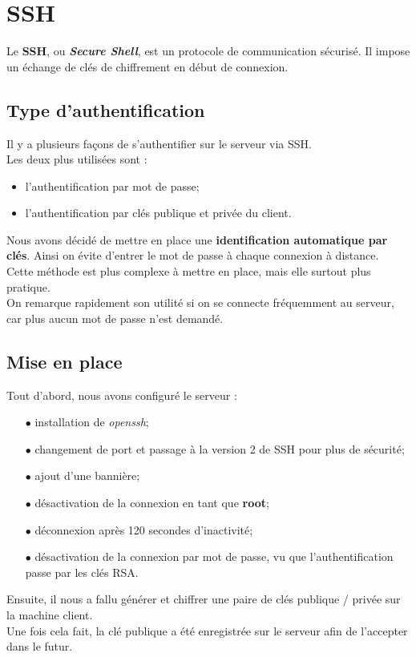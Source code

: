 \section{SSH}
\label{sec:ssh}

Le \textbf{SSH}, ou \textit{\textbf{Secure Shell}}, est un protocole de
communication sécurisé. Il impose un échange de clés de chiffrement en début de
connexion.


\subsection{Type d'authentification}
\label{subsec:type-authentification}

Il y a plusieurs façons de s'authentifier sur le serveur via SSH. \\
Les deux plus utilisées sont :
\begin{itemize}
    \item l'authentification par mot de passe;
    \item l'authentification par clés publique et privée du client. \\
\end{itemize}

Nous avons décidé de mettre en place une \textbf{identification automatique par
clés}. Ainsi on évite d'entrer le mot de passe à chaque connexion à distance. \\
Cette méthode est plus complexe à mettre en place, mais elle surtout plus
pratique. \\

On remarque rapidement son utilité si on se connecte fréquemment au serveur, car
plus aucun mot de passe n'est demandé.


\subsection{Mise en place}
\label{subsec:mise-en-place}

Tout d'abord, nous avons configuré le serveur :
\begin{itemize}

    \item[$\bullet$] installation de \textit{openssh};
    \item[$\bullet$] changement de port et passage à la version 2 de SSH pour plus de
    sécurité;
    \item[$\bullet$] ajout d'une bannière;
    \item[$\bullet$] désactivation de la connexion en tant que \textbf{root};
    \item[$\bullet$] déconnexion après 120 secondes d'inactivité;
    \item[$\bullet$] désactivation de la connexion par mot de passe, vu que l'authentification
    passe par les clés RSA. \\

\end{itemize}

Ensuite, il nous a fallu générer et chiffrer une paire de clés publique /
privée sur la machine client. \\
Une fois cela fait, la clé publique a été enregistrée sur le serveur afin de
l'accepter dans le futur.


